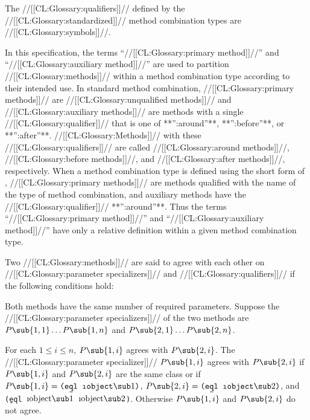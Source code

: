 The //[[CL:Glossary:qualifiers]]// defined by the //[[CL:Glossary:standardized]]// method combination types 
are //[[CL:Glossary:symbols]]//.

In this specification, the terms ``//[[CL:Glossary:primary method]]//'' and 
``//[[CL:Glossary:auxiliary method]]//'' are used to partition //[[CL:Glossary:methods]]//
within a method combination type according to their intended use.  
In standard method combination, //[[CL:Glossary:primary methods]]// are 
//[[CL:Glossary:unqualified methods]]// 
and //[[CL:Glossary:auxiliary methods]]// are methods with a single //[[CL:Glossary:qualifier]]// 
that is one of **'':around''**, **'':before''**, or **'':after''**.
//[[CL:Glossary:Methods]]// with these //[[CL:Glossary:qualifiers]]// are called //[[CL:Glossary:around methods]]//,
//[[CL:Glossary:before methods]]//, and //[[CL:Glossary:after methods]]//, respectively.
When a method combination type is defined using the short form of
, //[[CL:Glossary:primary methods]]// are 
methods qualified with the name of the type of method combination, 
and auxiliary methods have the //[[CL:Glossary:qualifier]]// **'':around''**.
Thus the terms ``//[[CL:Glossary:primary method]]//'' and ``//[[CL:Glossary:auxiliary method]]//''
have only a relative definition within a given method combination type.

\endSubsection%


Two //[[CL:Glossary:methods]]// are said to agree with each other on //[[CL:Glossary:parameter specializers]]//
and //[[CL:Glossary:qualifiers]]// if the following conditions hold:

\beginlist

 Both methods have the same number of required parameters.
Suppose the //[[CL:Glossary:parameter specializers]]// of the two methods are
$P\sub{1,1}\ldots P\sub{1,n}$ and $P\sub{2,1}\ldots P\sub{2,n}$.

 For each $1\leq i\leq n$, $P\sub{1,i}$ agrees with $P\sub{2,i}$.
The //[[CL:Glossary:parameter specializer]]// $P\sub{1,i}$ agrees with $P\sub{2,i}$ if
$P\sub{1,i}$ and $P\sub{2,i}$ are the same class or if 
$P\sub{1,i}=\hbox{{\tt(\b{eql} $\hbox{\i{object}}\sub 1$)}}$,
$P\sub{2,i}=\hbox{{\tt(\b{eql} $\hbox{\i{object}}\sub 2$)}}$, and
{\tt (\b{eql} $\hbox{\i{object}}\sub 1$ $\hbox{\i{object}}\sub 2$)}.
Otherwise $P\sub{1,i}$ and $P\sub{2,i}$ do not agree.


